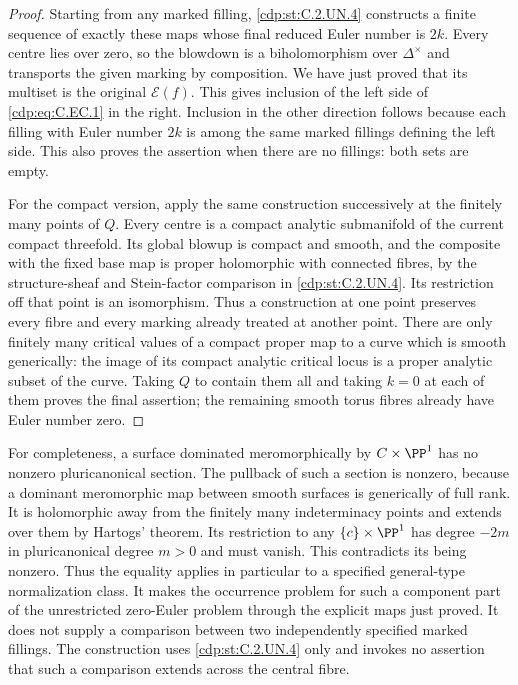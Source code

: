 \begin{proof}
Starting from any marked filling, \ref{cdp:st:C.2.UN.4} constructs a finite
sequence of exactly these maps whose final reduced Euler number is
$2k$. Every centre lies over zero, so the blowdown is a
biholomorphism over $\Delta^\times$ and transports the given marking
by composition. We have just proved that its multiset is the
original $\mathcal E(f)$. This gives inclusion of the left side of
\eqref{cdp:eq:C.EC.1} in the right. Inclusion in the other direction follows
because each filling with Euler number $2k$ is among the same
marked fillings defining the left side. This also proves the
assertion when there are no fillings: both sets are empty.

For the compact version, apply the same construction successively
at the finitely many points of $Q$. Every centre is a compact
analytic submanifold of the current compact threefold. Its global
blowup is compact and smooth, and the composite with the fixed base
map is proper holomorphic with connected fibres, by the
structure-sheaf and Stein-factor comparison in \ref{cdp:st:C.2.UN.4}. Its
restriction off that point is an isomorphism. Thus a construction
at one point preserves every fibre and every marking already
treated at another point. There are only finitely many critical
values of a compact proper map to a curve which is smooth
generically: the image of its compact analytic critical locus is
a proper analytic subset of the curve. Taking $Q$ to contain them
all and taking $k=0$ at each of them proves the final assertion;
the remaining smooth torus fibres already have Euler number zero.
\end{proof}

For completeness, a surface dominated meromorphically by
$C\times\PP^1$ has no nonzero pluricanonical section. The pullback
of such a section is nonzero, because a dominant meromorphic map
between smooth surfaces is generically of full rank. It is
holomorphic away from the finitely many indeterminacy points and
extends over them by Hartogs' theorem. Its restriction to any
$\{c\}\times\PP^1$ has degree $-2m$ in pluricanonical degree $m>0$
and must vanish. This contradicts its being nonzero. Thus the
equality applies in particular to a specified general-type
normalization class. It makes the occurrence problem for such a
component part of the unrestricted zero-Euler problem through the
explicit maps just proved. It does not supply a comparison between
two independently specified marked fillings. The construction
uses \ref{cdp:st:C.2.UN.4} only and invokes no assertion that such a comparison
extends across the central fibre.


